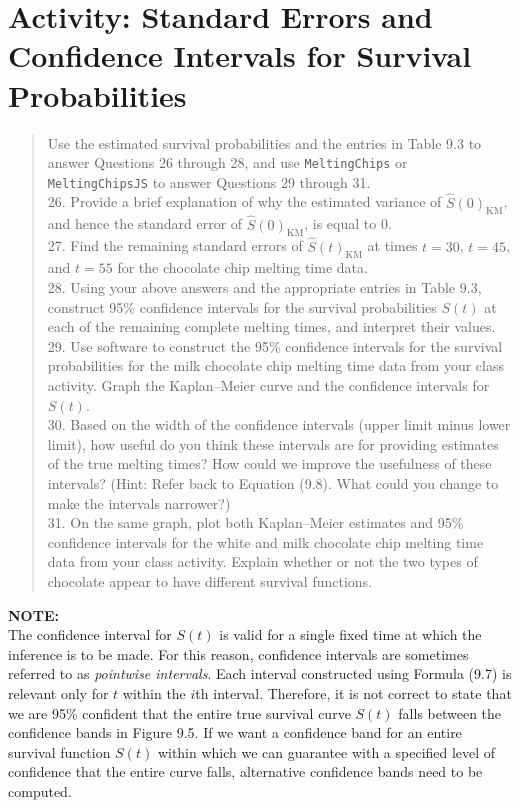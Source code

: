 \documentclass[
]{report}
\begin{document}
\section*{Activity: Standard Errors and Confidence Intervals for Survival Probabilities}\label{activity-standard-errors-and-confidence-intervals-for-survival-probabilities}

\begin{quote}
Use the estimated survival probabilities and the entries in Table 9.3 to answer Questions 26 through 28, and use \texttt{MeltingChips} or \texttt{MeltingChipsJS} to answer Questions 29 through 31.\\
26. Provide a brief explanation of why the estimated variance of \(\hat S(0)_{\mathrm{KM}}\), and hence the standard error of \(\hat S(0)_{\mathrm{KM}}\), is equal to 0.\\
27. Find the remaining standard errors of \(\hat S(t)_{\mathrm{KM}}\) at times \(t = 30\), \(t = 45\), and \(t = 55\) for the chocolate chip melting time data.\\
28. Using your above answers and the appropriate entries in Table 9.3, construct 95\% confidence intervals for the survival probabilities \(S(t)\) at each of the remaining complete melting times, and interpret their values.\\
29. Use software to construct the 95\% confidence intervals for the survival probabilities for the milk chocolate chip melting time data from your class activity. Graph the Kaplan--Meier curve and the confidence intervals for \(S(t)\).\\
30. Based on the width of the confidence intervals (upper limit minus lower limit), how useful do you think these intervals are for providing estimates of the true melting times? How could we improve the usefulness of these intervals? (Hint: Refer back to Equation (9.8). What could you change to make the intervals narrower?)\\
31. On the same graph, plot both Kaplan--Meier estimates and 95\% confidence intervals for the white and milk chocolate chip melting time data from your class activity. Explain whether or not the two types of chocolate appear to have different survival functions.
\end{quote}

\large

\textbf{NOTE:}\\
The confidence interval for \(S(t)\) is valid for a single fixed time at which the inference is to be made. For this reason, confidence intervals are sometimes referred to as \emph{pointwise intervals}. Each interval constructed using Formula (9.7) is relevant only for \(t\) within the \(i\)th interval. Therefore, it is not correct to state that we are 95\% confident that the entire true survival curve \(S(t)\) falls between the confidence bands in Figure 9.5. If we want a confidence band for an entire survival function \(S(t)\) within which we can guarantee with a specified level of confidence that the entire curve falls, alternative confidence bands need to be computed.\\
\normalsize
\end{document}
